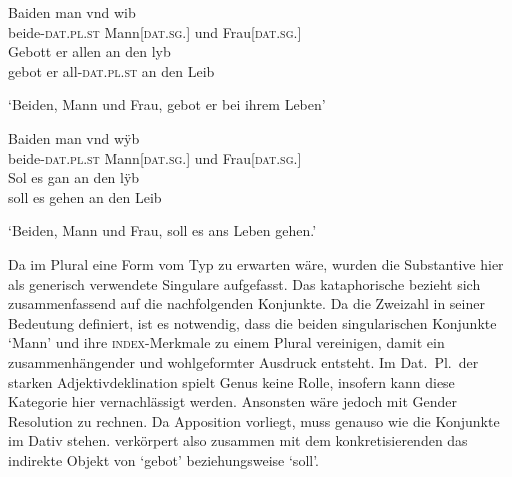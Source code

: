 \begin{exe}
\ex \label{ex:kczbeidenundesynt1}
\begin{xlist}
	\ex \label{ex:kczbeidenundesynt1_1}
		\gll Baiden man vnd wib \\
			beide-\textsc{dat.pl\subMF.st} Mann[\textsc{dat.sg.\MascM}] und
				Frau[\textsc{dat.sg.\NeutF}] \\
	\sn \gll Gebott er allen an den lyb \\
			gebot er all-\textsc{dat.pl\subMF.st} an den Leib \\
		\begin{taggedline}{%
			\parencites[\pno~10\va, 9--10]{kc:Z}[vgl.]%
			[619--621]{schroeder1895}}
		\trans `Beiden, Mann und Frau, gebot er bei ihrem Leben'
		\end{taggedline}

\ex \label{ex:kczbeidenundesynt1_2}
	\gll Baiden man vnd wÿb \\
		beide-\textsc{dat.pl\subMF.st} Mann[\textsc{dat.sg.\MascM}] und
			Frau[\textsc{dat.sg.\NeutF}] \\
\sn \gll Sol es gan an den lÿb \\
		soll es gehen an den Leib \\
	\begin{taggedline}{%
		\parencites[\pno~15\ra, 18--19]{kc:Z}%
		[zu][846--849]{schroeder1895}}
	\trans `Beiden, Mann und Frau, soll es ans Leben gehen.'
	\end{taggedline}
\end{xlist}
\end{exe}

Da im Plural eine Form vom Typ  zu erwarten wäre, wurden die
Substantive hier als generisch verwendete Singulare aufgefasst. Das
kataphorische  bezieht sich zusammenfassend auf die nachfolgenden
Konjunkte. Da  die Zweizahl in seiner Bedeutung definiert, ist
es notwendig, dass die beiden singularischen Konjunkte  `Mann'
und  ihre \textsc{index}-Merkmale zu einem Plural vereinigen, damit ein
zusammenhängender und wohlgeformter Ausdruck entsteht. Im Dat.~Pl.\ der starken
Adjektivdeklination spielt Genus keine Rolle, insofern kann diese Kategorie
hier vernachlässigt werden. Ansonsten wäre jedoch mit Gender Resolution zu
rechnen. Da Apposition vorliegt, muss  genauso wie die Konjunkte im
Dativ stehen.  verkörpert also zusammen mit dem konkretisierenden
 das indirekte Objekt von  `gebot'
beziehungsweise  `soll'.

